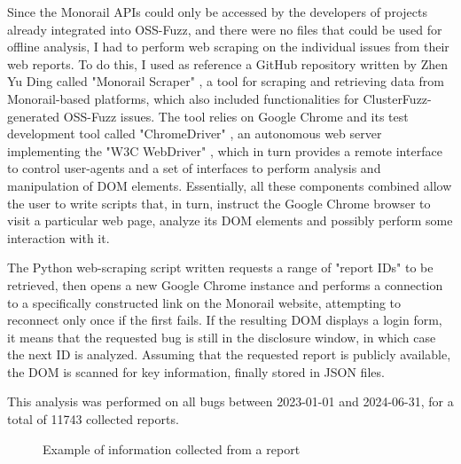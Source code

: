 Since the Monorail APIs could only be accessed by the developers of projects already integrated into OSS-Fuzz, and there were no files that could be used for offline analysis, I had to perform web scraping on the individual issues from their web reports. To do this, I used as reference a GitHub repository written by Zhen Yu Ding called "Monorail Scraper" \cite{scraper}, a tool for scraping and retrieving data from Monorail-based platforms, which also included functionalities for ClusterFuzz-generated OSS-Fuzz issues. The tool relies on Google Chrome and its test development tool called "ChromeDriver" \cite{driver}, an autonomous web server implementing the "W3C WebDriver" \cite{driver_standard}, which in turn provides a remote interface to control user-agents and a set of interfaces to perform analysis and manipulation of DOM elements. Essentially, all these components combined allow the user to write scripts that, in turn, instruct the Google Chrome browser to visit a particular web page, analyze its DOM elements and possibly perform some interaction with it.


\newpage
The Python web-scraping script written requests a range of "report IDs" to be retrieved, then opens a new Google Chrome instance and performs a connection to a specifically constructed link on the Monorail website, attempting to reconnect only once if the first fails. If the resulting DOM displays a login form, it means that the requested bug is still in the disclosure window, in which case the next ID is analyzed. Assuming that the requested report is publicly available, the DOM is scanned for key information, finally stored in JSON files. 
\newline

This analysis was performed on all bugs between 2023-01-01 and 2024-06-31, for a total of 11743 collected reports.

\begin{figure}[h]
\caption{Example of information collected from a report}
\label{fig:report}
\end{figure}


